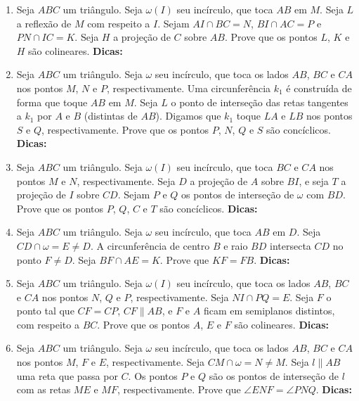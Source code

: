 \documentclass{article}
\newcommand{\dica}{\textbf{Dicas:}}
\newcommand{\iniTri}{Seja $ABC$ um triângulo}
\begin{document}
\begin{multicols}{2}
\begin{enumerate}
    \item \iniTri. Seja $\omega(I)$ seu incírculo, que toca $AB$ em $M$. Seja $L$ a reflexão de $M$ com respeito a $I$. Sejam $AI\cap BC=N$, $BI\cap AC=P$ e $PN\cap IC=K$. Seja $H$ a projeção de $C$ sobre $AB$. Prove que os pontos $L$, $K$ e $H$ são colineares. \dica %
    
    \item \iniTri. Seja $\omega$ seu incírculo, que toca os lados $AB$, $BC$ e $CA$ nos pontos $M$, $N$ e $P$, respectivamente. Uma circunferência $k_1$ é construída de forma que toque $AB$ em $M$. Seja $L$ o ponto de interseção das retas tangentes a $k_1$ por $A$ e $B$ (distintas de $AB$). Digamos que $k_1$ toque $LA$ e $LB$ nos pontos $S$ e $Q$, respectivamente. Prove que os pontos $P$, $N$, $Q$ e $S$ são concíclicos. \dica %
    
    \item \iniTri. Seja $\omega(I)$ seu incírculo, que toca $BC$ e $CA$ nos pontos $M$ e $N$, respectivamente. Seja $D$ a projeção de $A$ sobre $BI$, e seja $T$ a projeção de $I$ sobre $CD$. Sejam $P$ e $Q$ os pontos de interseção de $\omega$ com $BD$. Prove que os pontos $P$, $Q$, $C$ e $T$ são concíclicos. \dica %
    
    \item \iniTri. Seja $\omega$ seu incírculo, que toca $AB$ em $D$. Seja $CD\cap\omega=E\neq D$. A circunferência de centro $B$ e raio $BD$ intersecta $CD$ no ponto $F\neq D$. Seja $BF\cap AE=K$. Prove que $KF=FB$. \dica %
    
    \item \iniTri. Seja $\omega(I)$ seu incírculo, que toca os lados $AB$, $BC$ e $CA$ nos pontos $N$, $Q$ e $P$, respectivamente. Seja $NI\cap PQ=E$. Seja $F$ o ponto tal que $CF=CP$, $CF\parallel AB$, e $F$ e $A$ ficam em semiplanos distintos, com respeito a $BC$. Prove que os pontos $A$, $E$ e $F$ são colineares. \dica %
    
    \item \iniTri. Seja $\omega$ seu incírculo, que toca os lados $AB$, $BC$ e $CA$ nos pontos $M$, $F$ e $E$, respectivamente. Seja $CM\cap\omega = N\neq M$. Seja $l\parallel AB$ uma reta que passa por $C$. Os pontos $P$ e $Q$ são os pontos de interseção de $l$ com as retas $ME$ e $MF$, respectivamente. Prove que $\angle ENF=\angle PNQ$. \dica %
    

\end{enumerate}
\end{multicols}
\end{document}
